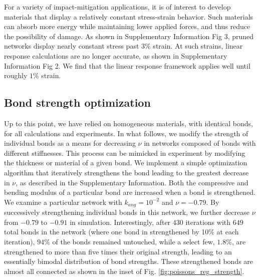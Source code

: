 \documentclass[9pt,twocolumn,twoside]{pnas-new}
\begin{document}
For a variety of impact-mitigation applications, it is of interest to develop materials that display a relatively constant stress-strain behavior. Such materials can absorb more energy while maintaining lower applied forces, and thus reduce the possibility of damage.  As shown in Supplementary Information Fig 3, pruned networks display nearly constant stress past $3\%$ strain.  At such strains, linear response calculations are no longer accurate, as shown in Supplementary Information Fig 2.  We find that the linear response framework applies well until roughly $1\%$ strain.


\subsection*{Bond strength optimization}
Up to this point, we have relied on homogeneous materials, with identical bonds, for all calculations and experiments. In what follows, we modify the strength of individual bonds as a means for decreasing $\nu$ in networks composed of bonds with different stiffnesses.  This process can be mimicked in experiment by modifying the thickness or material of a given bond.  We implement a simple optimization algorithm that iteratively strengthens the bond leading to the greatest decrease in $\nu$, as described in the Supplementary Information.  Both the compressive and bending modulus of a particular bond are increased when a bond is strengthened. We examine a particular network with $k_{ang}=10^{-2}$ and $\nu=-0.79$.  By successively strengthening individual bonds in this network, we further decrease $\nu$ from $-0.79$ to $-0.91$ in simulation.  Interestingly, after $430$ iterations with $649$ total bonds in the network (where one bond in strengthened by 10\% at each iteration), $94\%$ of the bonds remained untouched, while a select few, $1.8\%$, are strengthened to more than five times their original strength, leading to an essentially bimodal distribution of bond strengths. These strengthened bonds are almost all connected as shown in the inset of Fig. \ref{fig:poissons_reg_strength}.
\end{document}

